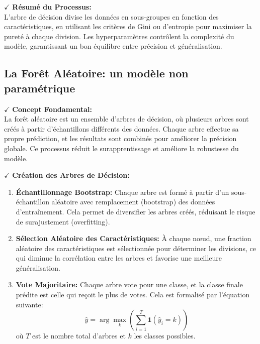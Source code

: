 \textbf{\(\checkmark\)} \textbf{Résumé du Processus:}\\
L'arbre de décision divise les données en sous-groupes en fonction des caractéristiques, en utilisant les critères de Gini ou d’entropie pour maximiser la pureté à chaque division. Les hyperparamètres contrôlent la complexité du modèle, garantissant un bon équilibre entre précision et généralisation.

\subsection{La Forêt Aléatoire: un modèle non paramétrique}

\textbf{\(\checkmark\)} \textbf{Concept Fondamental:}\\
La forêt aléatoire est un ensemble d'arbres de décision, où plusieurs arbres sont créés à partir d'échantillons différents des données. Chaque arbre effectue sa propre prédiction, et les résultats sont combinés pour améliorer la précision globale. Ce processus réduit le surapprentissage et améliore la robustesse du modèle.

\textbf{\(\checkmark\)} \textbf{Création des Arbres de Décision:}
\begin{enumerate}
    \item \textbf{Échantillonnage Bootstrap:} Chaque arbre est formé à partir d’un sous-échantillon aléatoire avec remplacement (bootstrap) des données d’entraînement. Cela permet de diversifier les arbres créés, réduisant le risque de surajustement (overfitting).
    
    \item \textbf{Sélection Aléatoire des Caractéristiques:} À chaque nœud, une fraction aléatoire des caractéristiques est sélectionnée pour déterminer les divisions, ce qui diminue la corrélation entre les arbres et favorise une meilleure généralisation.

    \item \textbf{Vote Majoritaire:} Chaque arbre vote pour une classe, et la classe finale prédite est celle qui reçoit le plus de votes. Cela est formalisé par l'équation suivante:
    \[
    \hat{y} = \arg\max_k \left( \sum_{i=1}^{T} \mathbf{1}(\hat{y}_i = k) \right)
    \]
    où \( T \) est le nombre total d'arbres et \( k \) les classes possibles.
\end{enumerate}

